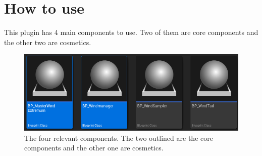 \documentclass[../main.tex]{subfile}
\begin{document}
    \section{How to use} This plugin has 4 main components to use. Two of them are core components and the other two are cosmetics.
    \begin{figure}[H]
        \centering
        \includegraphics[width=.5\textwidth]{Ressources/Files.png}
        \caption{The four relevant components. The two outlined are the core components and the other one are cosmetics.}
    \end{figure}
\end{document}
